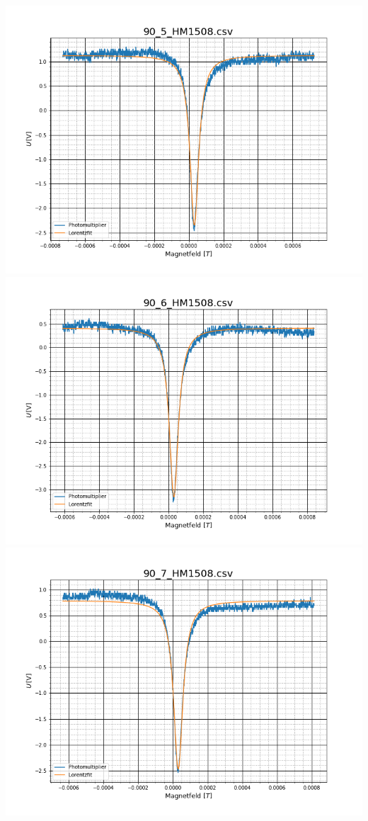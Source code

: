 \includegraphics[scale=0.3]{Bild/Anhang/Abkuhlung_2/abk_2_904}\\
\includegraphics[scale=0.3]{Bild/Anhang/Abkuhlung_2/abk_2_905}
\includegraphics[scale=0.3]{Bild/Anhang/Abkuhlung_2/abk_2_906}
